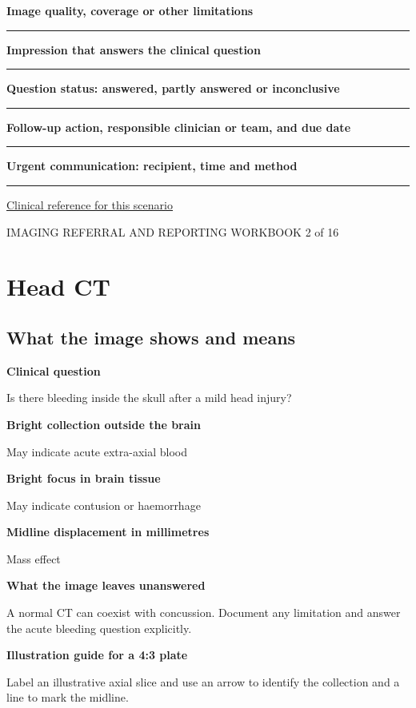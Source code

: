 \documentclass[11pt,a4paper]{article}
\newcommand{\record}[1]{\textbf{#1}\par\vspace{0.55\baselineskip}\hrule\vspace{0.35\baselineskip}}
\begin{document}
\record{Image quality, coverage or other limitations}

\record{Impression that answers the clinical question}

\record{Question status: answered, partly answered or inconclusive}

\record{Follow-up action, responsible clinician or team, and due date}

\record{Urgent communication: recipient, time and method}

\small\href{https://acsearch.acr.org/docs/69481/Narrative}{Clinical reference for this scenario}

\normalsize

\newpage

{\small IMAGING REFERRAL AND REPORTING WORKBOOK \hfill 2 of 16}

\section*{Head CT}

\subsection*{What the image shows and means}

\textbf{Clinical question}\par Is there bleeding inside the skull after a mild head injury?\par

\textbf{Bright collection outside the brain}\par May indicate acute extra-axial blood\par

\textbf{Bright focus in brain tissue}\par May indicate contusion or haemorrhage\par

\textbf{Midline displacement in millimetres}\par Mass effect\par

\textbf{What the image leaves unanswered}\par A normal CT can coexist with concussion. Document any limitation and answer the acute bleeding question explicitly.\par

\textbf{Illustration guide for a 4:3 plate}\par Label an illustrative axial slice and use an arrow to identify the collection and a line to mark the midline.\par
\end{document}
